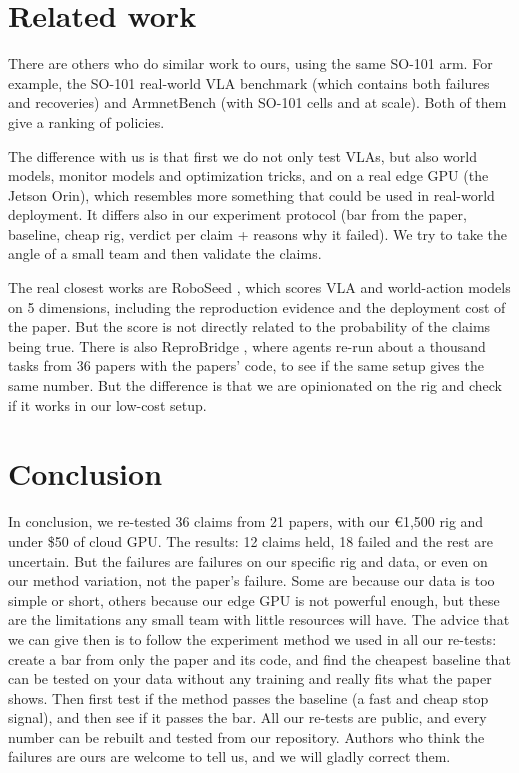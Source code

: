 \documentclass[10pt,twocolumn]{article}
\begin{document}
\section{Related work}


There are others who do similar work to ours, using the same SO-101 arm. For example, the SO-101 real-world VLA benchmark \citep{arxiv260608881} (which contains both failures and recoveries) and ArmnetBench \citep{arxiv260724481} (with SO-101 cells and at scale). Both of them give a ranking of policies.


The difference with us is that first we do not only test VLAs, but also world models, monitor models and optimization tricks, and on a real edge GPU (the Jetson Orin), which resembles more something that could be used in real-world deployment. It differs also in our experiment protocol (bar from the paper, baseline, cheap rig, verdict per claim + reasons why it failed). We try to take the angle of a small team and then validate the claims.


The real closest works are RoboSeed \citep{arxiv261040026}, which scores VLA and world-action models on 5 dimensions, including the reproduction evidence and the deployment cost of the paper. But the score is not directly related to the probability of the claims being true. There is also ReproBridge \citep{reprobridge2026}, where agents re-run about a thousand tasks from 36 papers with the papers' code, to see if the same setup gives the same number. But the difference is that we are opinionated on the rig and check if it works in our low-cost setup.


\section{Conclusion}


In conclusion, we re-tested 36 claims from 21 papers, with our €1,500 rig and under \$50 of cloud GPU. The results: 12 claims held, 18 failed and the rest are uncertain. But the failures are failures on our specific rig and data, or even on our method variation, not the paper's failure. Some are because our data is too simple or short, others because our edge GPU is not powerful enough, but these are the limitations any small team with little resources will have.
The advice that we can give then is to follow the experiment method we used in all our re-tests: create a bar from only the paper and its code, and find the cheapest baseline that can be tested on your data without any training and really fits what the paper shows. Then first test if the method passes the baseline (a fast and cheap stop signal), and then see if it passes the bar.
All our re-tests are public, and every number can be rebuilt and tested from our repository.
Authors who think the failures are ours are welcome to tell us, and we will gladly correct them.
\end{document}
